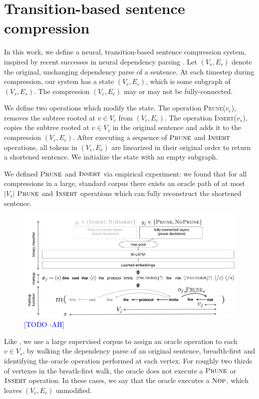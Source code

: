 \documentclass[11pt,a4paper]{article}
\newcommand{\ahcomment}[1]{\textcolor{blue}{[#1 -AH]}}
\begin{document}
\section{Transition-based sentence compression}\label{s:system}

In this work, we define a neural, transition-based sentence compression system, inspired by recent successes in neural dependency parsing \cite{D14-1082}. Let ${(V_s,E_s)}$ denote the original, unchanging dependency parse of a sentence. At each timestep during compression, our system has a state ${(V_c,E_c)}$, which is some subgraph of ${(V_s,E_s)}$. The compression ${(V_c,E_c)}$ may or may not be fully-connected. 

We define two operations which modify the state. The operation \textsc{Prune}($v_c$), removes the subtree rooted at $v \in V_c$ from ${(V_c,E_c)}$. The operation \textsc{Insert}($v_s$), copies the subtree rooted at $v \in V_s$ in the original sentence and adds it to the compression ${(V_c,E_c)}$. After executing a sequence of $\textsc{Prune}$ and $\textsc{Insert}$ operations, all tokens in ${(V_c,E_c)}$ are linearized in their original order to return a shortened sentence. We initialize the state with an empty subgraph. 

We defined $\textsc{Prune}$ and $\textsc{Insert}$ via empirical experiment: we found that for all compressions in a large, standard  corpus \cite{filippova2013overcoming} there exists an oracle path of at most $|V_s|$ $\textsc{Prune}$ and $\textsc{Insert}$ operations which can fully reconstruct the shortened sentence. 

\begin{figure}[htb!]
\centering
\includegraphics[width=.75\textwidth]{example.pdf}
\caption{\ahcomment{TODO}}
\label{f:example}
\end{figure}

Like \cite{D14-1082}, we use a large supervised corpus to assign an oracle operation to each $v \in V_s$, by walking the dependency parse of an original sentence, breadth-first and identifying the oracle operation performed at each vertex. For roughly two thirds of vertexes in the breath-first walk, the oracle does not execute a $\textsc{Prune}$ or $\textsc{Insert}$ operation. In these cases, we say that the oracle executes a $\textsc{Nop}$, which leaves ${(V_c,E_c)}$ unmodified. 
\end{document}

